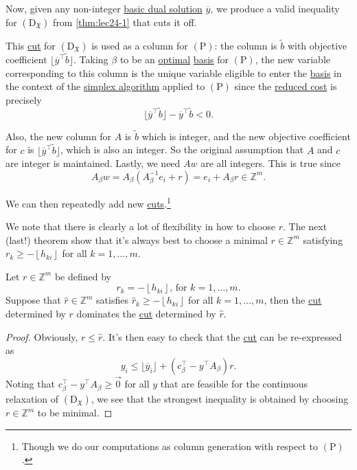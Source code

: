 Now, given any non-integer \hyperref[def:dual-basic-solution]{basic dual solution} \(\overline{y}\), we produce a valid inequality for \((\mathrm{D}_{\mathfrak{X}})\) from \autoref{thm:lec24-1} that cuts it off.
\begin{note}
	This \hyperref[def:Chvatal-Gomory-cut]{cut} for \((\mathrm{D}_{\mathfrak{X}})\) is used as a column for \((\mathrm{P})\): the column is \(\widetilde{b} \) with objective coefficient \(\lfloor \overline{y} ^{\top} \widetilde{b} \rfloor\). Taking \(\beta\) to be an \hyperref[def:optimal-solution]{optimal} \hyperref[def:basis]{basis} for \((\mathrm{P})\), the new variable corresponding to this column is the unique variable eligible to enter the \hyperref[def:basis]{basis} in the context of the \hyperref[algo:simplex-algorithm]{simplex algorithm} applied to \((\mathrm{P})\) since the \hyperref[def:reduced-cost]{reduced cost} is precisely
	\[
		\lfloor \overline{y} ^{\top} \widetilde{b} \rfloor-\overline{y} ^{\top} \widetilde{b} < 0.
	\]

	Also, the new column for \(A\) is \(\widetilde{b} \) which is integer, and the new objective coefficient for \(c\) is \(\lfloor \overline{y} ^{\top} \widetilde{b} \rfloor\), which is also an integer. So the original assumption that \(A\) and \(c\) are integer is maintained. Lastly, we need \(Aw\) are all integers. This is true since
	\[
		A_{\beta}w = A_{\beta}\left(A^{-1}_{\beta}e_{i}+r\right) = e_{i}+A_{\beta}r \in \mathbb{Z}^m.
	\]

	We can then repeatedly add new \hyperref[def:Chvatal-Gomory-cut]{cuts}.\footnote{Though we do our computations as column generation with respect to \((\mathrm{P})\).}
\end{note}

We note that there is clearly a lot of flexibility in how to choose \(r\). The next (last!) theorem show that it's always best to choose a minimal \(r\in \mathbb{Z} ^m\)  satisfying \(r_k \geq -\left\lfloor h_{ki} \right\rfloor\) for all \(k = 1, \dots  , m\).

\begin{theorem}\label{thm:lec24-3}
	Let \(r\in \mathbb{Z} ^m\) be defined by
	\[
		r_k = -\left\lfloor h_{ki} \right\rfloor\text{, for }k = 1, \dots , m.
	\]
	Suppose that \(\hat{r} \in \mathbb{Z} ^m\) satisfies \(\hat{r}_k \geq -\left\lfloor h_{ki} \right\rfloor\) for all \(k = 1, \dots , m\), then the \hyperref[def:Chvatal-Gomory-cut]{cut} determined by \(r\) dominates the \hyperref[def:Chvatal-Gomory-cut]{cut} determined by \(\hat{r} \).
\end{theorem}
\begin{proof}
	Obviously, \(r \leq \hat{r} \). It's then easy to check that the \hyperref[def:Chvatal-Gomory-cut]{cut} can be re-expressed as
	\[
		y_{i} \leq \lfloor \overline{y} _{i} \rfloor + (c^{\top} _\beta - y^{\top} A_\beta )r.
	\]
	Noting that \(c^{\top} _\beta - y^{\top} A_\beta \geq \vec{0} \) for all \(y\) that are feasible for the continuous relaxation of \((\mathrm{D}_{\mathfrak{X}})\), we see that the strongest inequality is obtained by choosing \(r\in\mathbb{Z} ^m\) to be minimal.
\end{proof}

